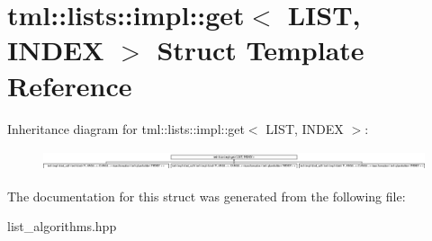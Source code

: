 \hypertarget{structtml_1_1lists_1_1impl_1_1get}{\section{tml\+:\+:lists\+:\+:impl\+:\+:get$<$ L\+I\+S\+T, I\+N\+D\+E\+X $>$ Struct Template Reference}
\label{structtml_1_1lists_1_1impl_1_1get}
}
Inheritance diagram for tml\+:\+:lists\+:\+:impl\+:\+:get$<$ L\+I\+S\+T, I\+N\+D\+E\+X $>$\+:\begin{figure}[H]
\begin{center}
\leavevmode
\includegraphics[height=0.604099cm]{structtml_1_1lists_1_1impl_1_1get}
\end{center}
\end{figure}


The documentation for this struct was generated from the following file\+:\begin{DoxyCompactItemize}
\item 
list\+\_\+algorithms.\+hpp\end{DoxyCompactItemize}
